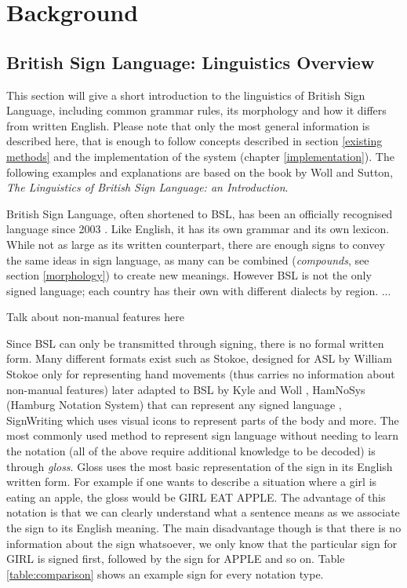 \documentclass[12pt]{ociamthesis}  %
\begin{document}

\chapter{Background}
\section{British Sign Language: Linguistics Overview}
This section will give a short introduction to the linguistics of British Sign Language, including common grammar rules, its morphology and how it differs from written English. Please note that only the most general information is described here, that is enough to follow concepts described in section \ref{existing methods} and the implementation of the system (chapter \ref{implementation}). The following examples and explanations are based on the book by Woll and Sutton, \textit{The Linguistics of British Sign Language: an Introduction}.

British Sign Language, often shortened to BSL, has been an officially recognised language since 2003 . Like English, it has its own grammar  and its own lexicon. While not as large as its written counterpart, there are enough signs to convey the same ideas in sign language, as many can be combined (\textit{compounds}, see section \ref{morphology}) to create new meanings. However BSL is not the only signed language; each country has their own with different dialects by region. ...  

Talk about non-manual features here

Since BSL can only be transmitted through signing, there is no formal written form. Many different formats exist such as Stokoe, designed for ASL by William Stokoe only for representing hand movements  (thus carries no information about non-manual features) later adapted to BSL by Kyle and Woll , HamNoSys (Hamburg Notation System) that can represent any signed language , SignWriting which uses visual icons to represent parts of the body  and more. The most commonly used method to represent sign language without needing to learn the notation (all of the above require additional knowledge to be decoded) is through \textit{gloss}. Gloss uses the most basic representation of the sign in its English written form. For example if one wants to describe a situation where a girl is eating an apple, the gloss would be GIRL EAT APPLE. The advantage of this notation is that we can clearly understand what a sentence means as we associate the sign to its English meaning. The main disadvantage though is that there is no information about the sign whatsoever, we only know that the particular sign for GIRL is signed first, followed by the sign for APPLE and so on. Table \ref{table:comparison} shows an example sign for every notation type.
\end{document}

